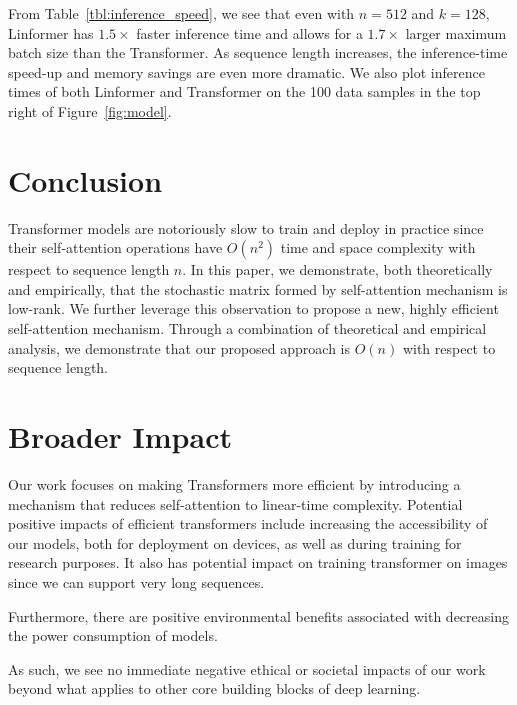 From Table~\ref{tbl:inference_speed}, we see that even with $n = 512$ and $k = 128$, Linformer has 
$1.5\times$ faster inference time and allows for a $1.7\times$ larger maximum batch size than the Transformer. As sequence length increases, the inference-time speed-up and memory savings are even more dramatic. We also plot inference times of both Linformer and Transformer on the 100 data samples in the top right of Figure~\ref{fig:model}.

\section{Conclusion}

Transformer models are notoriously slow to train and deploy in practice since their self-attention operations have $O(n^2)$ time and space complexity with respect to sequence length $n$. In this paper, we demonstrate, both theoretically and empirically, that the stochastic matrix formed by self-attention mechanism is low-rank. We further leverage this observation to propose a new, highly efficient self-attention mechanism. Through a combination of theoretical and empirical analysis, we demonstrate that our proposed approach is $O(n)$ with respect to sequence length.

\section*{Broader Impact} Our work focuses on making Transformers more efficient by introducing a mechanism that reduces self-attention to linear-time complexity. Potential positive impacts of efficient transformers include increasing the accessibility of our models, both for deployment on devices, as well as during training for research purposes. It also has potential impact on training transformer on images since we can support very long sequences. 

Furthermore, there are positive environmental benefits associated with decreasing the power consumption of models.

As such, we see no immediate negative ethical or societal impacts of our work beyond what applies to other core building blocks of deep learning.


